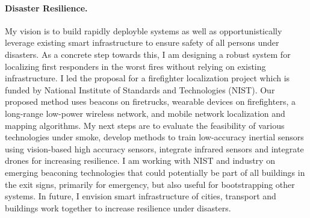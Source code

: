 \documentclass[10pt]{article}
\begin{document}
\paragraph{Disaster Resilience. }
My vision is to build rapidly deployble systems as well as opportunistically leverage existing smart infrastructure to ensure safety of all persons under disasters. %
As a concrete step towards this, I am designing a robust system for localizing first responders in the worst fires without relying on existing infrastructure. I led the proposal for a firefighter localization project which is funded by National Institute of Standards and Technologies (NIST).  
Our proposed method uses beacons on firetrucks, wearable devices on firefighters, a long-range low-power wireless network, and mobile network localization and mapping algorithms. 
My next steps are to evaluate the feasibility of various technologies under smoke, develop methods to train low-accuracy inertial sensors using vision-based high accuracy sensors, integrate infrared sensors and integrate drones for increasing resilience. I am working with NIST and industry on emerging beaconing technologies that could potentially be part of all buildings in the exit signs, primarily for emergency, but also useful for bootstrapping other systems. In future, I envision smart infrastructure of cities, transport and buildings work together to increase resilience under disasters. %
 
\end{document}
